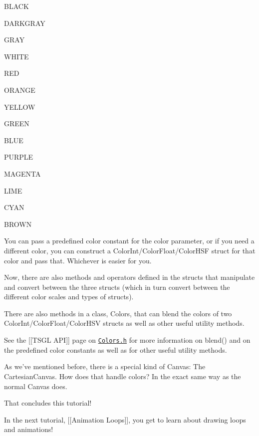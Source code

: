 \begin{DoxyItemize}
\item {\ttfamily B\-L\-A\-C\-K}
\item {\ttfamily D\-A\-R\-K\-G\-R\-A\-Y}
\item {\ttfamily G\-R\-A\-Y}
\item {\ttfamily W\-H\-I\-T\-E}
\item {\ttfamily R\-E\-D}
\item {\ttfamily O\-R\-A\-N\-G\-E}
\item {\ttfamily Y\-E\-L\-L\-O\-W}
\item {\ttfamily G\-R\-E\-E\-N}
\item {\ttfamily B\-L\-U\-E}
\item {\ttfamily P\-U\-R\-P\-L\-E}
\item {\ttfamily M\-A\-G\-E\-N\-T\-A}
\item {\ttfamily L\-I\-M\-E}
\item {\ttfamily C\-Y\-A\-N}
\item {\ttfamily B\-R\-O\-W\-N}
\end{DoxyItemize}

You can pass a predefined color constant for the color parameter, or if you need a different color, you can construct a {\ttfamily Color\-Int/\-Color\-Float/\-Color\-H\-S\-F} struct for that color and pass that. Whichever is easier for you.

Now, there are also methods and operators defined in the structs that manipulate and convert between the three structs (which in turn convert between the different color scales and types of structs).

There are also methods in a class, {\ttfamily Colors}, that can blend the colors of two {\ttfamily Color\-Int/\-Color\-Float/\-Color\-H\-S\-V} structs as well as other useful utility methods.

See the \mbox{[}\mbox{[}T\-S\-G\-L A\-P\-I\mbox{]}\mbox{]} page on \href{http://calvin-cs.github.io/TSGL/html/classtsgl_1_1_colors.html}{\tt Colors.\-h} for more information on {\ttfamily blend()} and on the predefined color constants as well as for other useful utility methods.

As we've mentioned before, there is a special kind of Canvas\-: The Cartesian\-Canvas. How does that handle colors? In the exact same way as the normal Canvas does.

That concludes this tutorial!

In the next tutorial, \mbox{[}\mbox{[}Animation Loops\mbox{]}\mbox{]}, you get to learn about drawing loops and animations! 